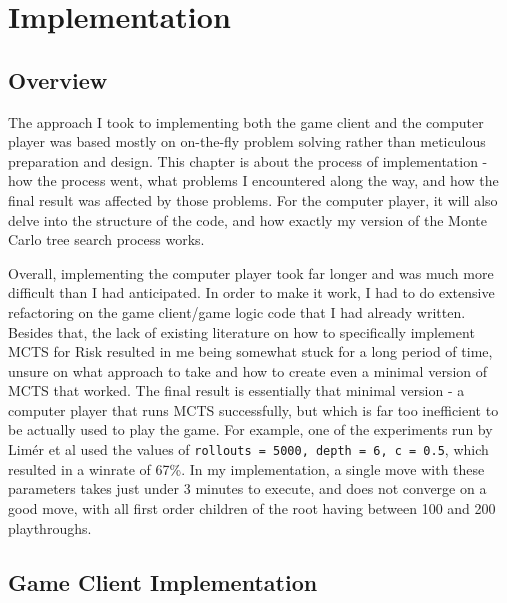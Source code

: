 \graphicspath{ {./Images/} }
\chapter{Implementation}
\section{Overview}
\label{implementationOverview}

The approach I took to implementing both the game client and the computer player was based mostly on on-the-fly problem solving rather than meticulous preparation and design. This chapter is about the process of implementation - how the process went, what problems I encountered along the way, and how the final result was affected by those problems. For the computer player, it will also delve into the structure of the code, and how exactly my version of the Monte Carlo tree search process works.

Overall, implementing the computer player took far longer and was much more difficult than I had anticipated. In order to make it work, I had to do extensive refactoring on the game client/game logic code that I had already written. Besides that, the lack of existing literature on how to specifically implement MCTS for Risk resulted in me being somewhat stuck for a long period of time, unsure on what approach to take and how to create even a minimal version of MCTS that worked. The final result is essentially that minimal version - a computer player that runs MCTS successfully, but which is far too inefficient to be actually used to play the game. For example, one of the experiments run by Lim{\'e}r et al \cite{limer2020monte} used the values of \texttt{rollouts = 5000, depth = 6, c = 0.5}, which resulted in a winrate of 67\%. In my implementation, a single move with these parameters takes just under 3 minutes to execute, and does not converge on a good move, with all first order children of the root having between 100 and 200 playthroughs.

\section{Game Client Implementation}
\label{gameClientImplementation}
